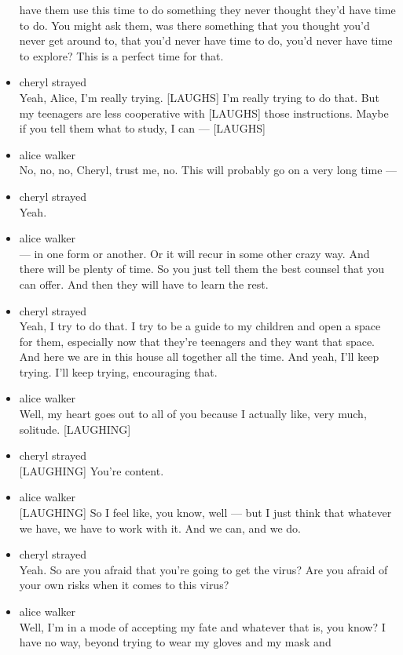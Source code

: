 \begin{itemize}
  have them use this time to do something they never thought they'd have
  time to do. You might ask them, was there something that you thought
  you'd never get around to, that you'd never have time to do, you'd
  never have time to explore? This is a perfect time for that.
\item
  cheryl strayed\\
  Yeah, Alice, I'm really trying. {[}LAUGHS{]} I'm really trying to do
  that. But my teenagers are less cooperative with {[}LAUGHS{]} those
  instructions. Maybe if you tell them what to study, I can ---
  {[}LAUGHS{]}
\item
  alice walker\\
  No, no, no, Cheryl, trust me, no. This will probably go on a very long
  time ---
\item
  cheryl strayed\\
  Yeah.
\item
  alice walker\\
  --- in one form or another. Or it will recur in some other crazy way.
  And there will be plenty of time. So you just tell them the best
  counsel that you can offer. And then they will have to learn the rest.
\item
  cheryl strayed\\
  Yeah, I try to do that. I try to be a guide to my children and open a
  space for them, especially now that they're teenagers and they want
  that space. And here we are in this house all together all the time.
  And yeah, I'll keep trying. I'll keep trying, encouraging that.
\item
  alice walker\\
  Well, my heart goes out to all of you because I actually like, very
  much, solitude. {[}LAUGHING{]}
\item
  cheryl strayed\\
  {[}LAUGHING{]} You're content.
\item
  alice walker\\
  {[}LAUGHING{]} So I feel like, you know, well --- but I just think
  that whatever we have, we have to work with it. And we can, and we do.
\item
  cheryl strayed\\
  Yeah. So are you afraid that you're going to get the virus? Are you
  afraid of your own risks when it comes to this virus?
\item
  alice walker\\
  Well, I'm in a mode of accepting my fate and whatever that is, you
  know? I have no way, beyond trying to wear my gloves and my mask and

\end{itemize}

